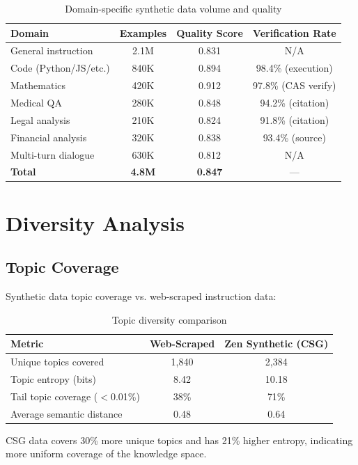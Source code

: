 \documentclass[11pt,a4paper]{article}
\begin{document}
\begin{table}[H]
\centering
\caption{Domain-specific synthetic data volume and quality}
\label{tab:domain_data}
\begin{tabular}{lccc}
\toprule
Domain & Examples & Quality Score & Verification Rate \\
\midrule
General instruction & 2.1M & 0.831 & N/A \\
Code (Python/JS/etc.) & 840K & 0.894 & 98.4\% (execution) \\
Mathematics & 420K & 0.912 & 97.8\% (CAS verify) \\
Medical QA & 280K & 0.848 & 94.2\% (citation) \\
Legal analysis & 210K & 0.824 & 91.8\% (citation) \\
Financial analysis & 320K & 0.838 & 93.4\% (source) \\
Multi-turn dialogue & 630K & 0.812 & N/A \\
\midrule
\textbf{Total} & \textbf{4.8M} & \textbf{0.847} & — \\
\bottomrule
\end{tabular}
\end{table}

\section{Diversity Analysis}

\subsection{Topic Coverage}

Synthetic data topic coverage vs. web-scraped instruction data:

\begin{table}[H]
\centering
\caption{Topic diversity comparison}
\label{tab:diversity}
\begin{tabular}{lcc}
\toprule
Metric & Web-Scraped & Zen Synthetic (CSG) \\
\midrule
Unique topics covered & 1,840 & 2,384 \\
Topic entropy (bits) & 8.42 & 10.18 \\
Tail topic coverage ($<$0.01\%) & 38\% & 71\% \\
Average semantic distance & 0.48 & 0.64 \\
\bottomrule
\end{tabular}
\end{table}

CSG data covers 30\% more unique topics and has 21\% higher entropy, indicating more uniform coverage of the knowledge space.
\end{document}
